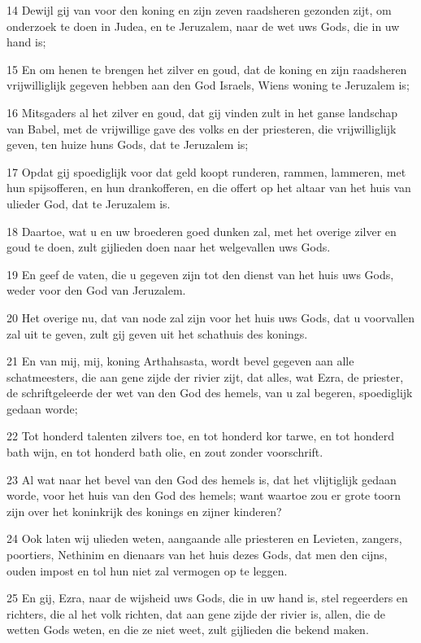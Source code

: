 \par 14 Dewijl gij van voor den koning en zijn zeven raadsheren gezonden zijt, om onderzoek te doen in Judea, en te Jeruzalem, naar de wet uws Gods, die in uw hand is;
\par 15 En om henen te brengen het zilver en goud, dat de koning en zijn raadsheren vrijwilliglijk gegeven hebben aan den God Israels, Wiens woning te Jeruzalem is;
\par 16 Mitsgaders al het zilver en goud, dat gij vinden zult in het ganse landschap van Babel, met de vrijwillige gave des volks en der priesteren, die vrijwilliglijk geven, ten huize huns Gods, dat te Jeruzalem is;
\par 17 Opdat gij spoediglijk voor dat geld koopt runderen, rammen, lammeren, met hun spijsofferen, en hun drankofferen, en die offert op het altaar van het huis van ulieder God, dat te Jeruzalem is.
\par 18 Daartoe, wat u en uw broederen goed dunken zal, met het overige zilver en goud te doen, zult gijlieden doen naar het welgevallen uws Gods.
\par 19 En geef de vaten, die u gegeven zijn tot den dienst van het huis uws Gods, weder voor den God van Jeruzalem.
\par 20 Het overige nu, dat van node zal zijn voor het huis uws Gods, dat u voorvallen zal uit te geven, zult gij geven uit het schathuis des konings.
\par 21 En van mij, mij, koning Arthahsasta, wordt bevel gegeven aan alle schatmeesters, die aan gene zijde der rivier zijt, dat alles, wat Ezra, de priester, de schriftgeleerde der wet van den God des hemels, van u zal begeren, spoediglijk gedaan worde;
\par 22 Tot honderd talenten zilvers toe, en tot honderd kor tarwe, en tot honderd bath wijn, en tot honderd bath olie, en zout zonder voorschrift.
\par 23 Al wat naar het bevel van den God des hemels is, dat het vlijtiglijk gedaan worde, voor het huis van den God des hemels; want waartoe zou er grote toorn zijn over het koninkrijk des konings en zijner kinderen?
\par 24 Ook laten wij ulieden weten, aangaande alle priesteren en Levieten, zangers, poortiers, Nethinim en dienaars van het huis dezes Gods, dat men den cijns, ouden impost en tol hun niet zal vermogen op te leggen.
\par 25 En gij, Ezra, naar de wijsheid uws Gods, die in uw hand is, stel regeerders en richters, die al het volk richten, dat aan gene zijde der rivier is, allen, die de wetten Gods weten, en die ze niet weet, zult gijlieden die bekend maken.
